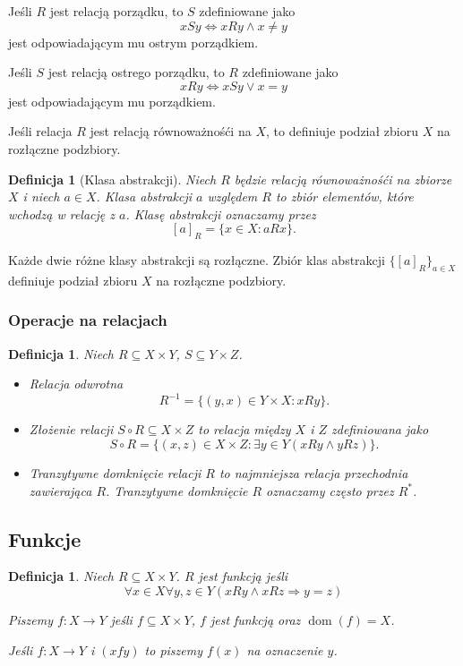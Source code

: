 \documentclass[12pt]{article}
\newcommand{\isfunc}[3]{{{#1}\colon{#2}\rightarrow{#3}}}
\newcommand{\imp}{\Rightarrow}
\newtheorem{dfn}[thm]{Definicja}
\DeclareMathOperator{\dom}{dom}
\begin{document}
	Jeśli $R$ jest relacją porządku, to $S$ zdefiniowane jako 
\[ xSy \iff xRy \land x\not= y\]
jest odpowiadającym mu ostrym porządkiem.

Jeśli $S$ jest relacją ostrego porządku, to $R$ zdefiniowane jako 
\[ xRy \iff xSy \lor x= y\]
jest odpowiadającym mu porządkiem.


	Jeśli relacja $R$ jest relacją równoważnośći na $X$, to definiuje 
podział zbioru $X$ na rozłączne podzbiory.

\begin{dfn}[Klasa abstrakcji]
Niech $R$ będzie relacją równoważnośći na zbiorze $X$ i niech $a\in X$.
Klasa abstrakcji $a$ względem $R$ to zbiór elementów, które wchodzą 
w relację z $a$. Klasę abstrakcji oznaczamy przez
\[ 
[a]_R = \{ x\in X\colon aRx\}.
\]
\end{dfn}
Każde dwie różne klasy abstrakcji są rozłączne. 
Zbiór klas abstrakcji $\{ [a]_R \}_{a\in X}$ definiuje podział zbioru $X$
na rozłączne podzbiory. 


\subsubsection{Operacje na relacjach}

\begin{dfn}
	Niech $R\subseteq X\times Y$, $S\subseteq Y\times Z$. 
	\begin{itemize}
		\item Relacja odwrotna 
		 \[R^{-1} = \{ (y,x)\in Y\times X\colon xRy \}.\]
		\item Złożenie relacji $S\circ R\subseteq X\times Z$ 
		to relacja między $X$ i $Z$ zdefiniowana jako 
		\[ 
		S\circ R = \{ (x,z)\in X\times Z\colon \exists y\in Y(xRy \land yRz)\}.
		\]
		\item Tranzytywne domknięcie relacji $R$ to najmniejsza relacja przechodnia zawierająca $R$. Tranzytywne domknięcie $R$ oznaczamy często 
		przez $R^*$.
	\end{itemize}
\end{dfn}

	
\subsection{Funkcje}

\begin{dfn}
	Niech $R\subseteq X\times Y$. 
	$R$ jest funkcją jeśli 
	\[
	 \forall x\in X \forall y,z \in Y(xRy\land xRz \imp y=z)
	\]
	
	Piszemy $f\colon X\rightarrow Y$ jeśli $f\subseteq X\times Y$, $f$ jest funkcją oraz $\dom(f) = X$.
	
	Jeśli $\isfunc{f}{X}{Y}$ i $(xfy)$ to piszemy $f(x)$ na oznaczenie 
	$y$. 
\end{dfn}
\end{document}
